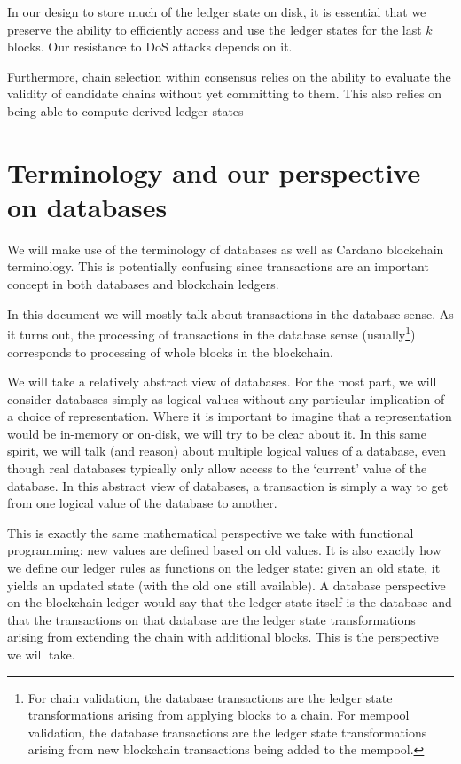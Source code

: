 \documentclass[11pt,a4paper]{article}
\begin{document}
In our design to store much of the ledger state on disk, it is essential that we
preserve the ability to efficiently access and use the ledger states for the
last $k$ blocks. Our resistance to DoS attacks depends on it.

Furthermore, chain selection within consensus relies on the ability to evaluate
the validity of candidate chains without yet committing to them. This also
relies on being able to compute derived ledger states

\section{Terminology and our perspective on databases}
\label{terminology}

We will make use of the terminology of databases as well as Cardano blockchain
terminology. This is potentially confusing since transactions are an important
concept in both databases and blockchain ledgers.

In this document we will mostly talk about transactions in the database sense.
As it turns out, the processing of transactions in the database sense
(usually\footnote{For chain validation, the database transactions are the ledger
state transformations arising from applying blocks to a chain. For mempool
validation, the database transactions are the ledger state transformations
arising from new blockchain transactions being added to the mempool.})
corresponds to processing of whole blocks in the blockchain.

We will take a relatively abstract view of databases. For the most part, we will
consider databases simply as logical values without any particular implication
of a choice of representation. Where it is important to imagine that a
representation would be in-memory or on-disk, we will try to be clear about
it. In this same spirit, we will talk (and reason) about multiple logical
values of a database, even though real databases typically only allow access
to the `current' value of the database. In this abstract view of databases, a
transaction is simply a way to get from one logical value of the database to
another.

This is exactly the same mathematical perspective we take with functional
programming: new values are defined based on old values. It is also exactly how
we define our ledger rules as functions on the ledger state: given an old state,
it yields an updated state (with the old one still available). A database
perspective on the blockchain ledger would say that the ledger state itself is
the database and that the transactions on that database are the ledger state
transformations arising from extending the chain with additional blocks. This is
the perspective we will take.
\end{document}
